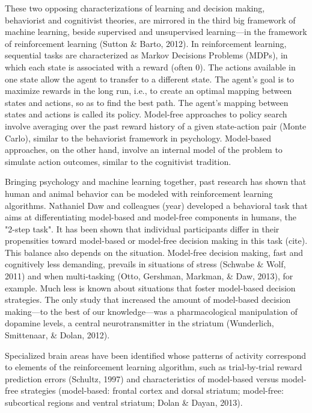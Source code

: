 \documentclass[11pt]{article} %
\begin{document}
These two opposing characterizations of learning and decision making, behaviorist and cognitivist theories, are mirrored in the third big framework of machine learning, beside supervised and unsupervised learning---in the framework of reinforcement learning (Sutton \& Barto, 2012). In reinforcement learning, sequential tasks are characterized as Markov Decisions Problems (MDPs), in which each state is associated with a reward (often 0). The actions available in one state allow the agent to transfer to a different state. The agent's goal is to maximize rewards in the long run, i.e., to create an optimal mapping between states and actions, so as to find the best path. The agent's mapping between states and actions is called its policy. Model-free approaches to policy search involve averaging over the past reward history of a given state-action pair (Monte Carlo), similar to the behaviorist framework in psychology. Model-based approaches, on the other hand, involve an internal model of the problem to simulate action outcomes, similar to the cognitivist tradition.

Bringing psychology and machine learning together, past research has shown that human and animal behavior can be modeled with reinforcement learning algorithms. Nathaniel Daw and colleagues (year) developed a behavioral task that aims at differentiating model-based and model-free components in humans, the "2-step task". It has been shown that individual participants differ in their propensities toward model-based or model-free decision making in this task (cite). This balance also depends on the situation. Model-free decision making, fast and cognitively less demanding, prevails in situations of stress (Schwabe \& Wolf, 2011) and when multi-tasking (Otto, Gershman, Markman, \& Daw, 2013), for example. Much less is known about situations that foster model-based decision strategies. The only study that increased the amount of model-based decision making---to the best of our knowledge---was a pharmacological manipulation of dopamine levels, a central neurotransmitter in the striatum (Wunderlich, Smittenaar, \& Dolan, 2012).

Specialized brain areas have been identified whose patterns of activity correspond to elements of the reinforcement learning algorithm, such as trial-by-trial reward prediction errors (Schultz, 1997) and characteristics of model-based versus model-free strategies (model-based: frontal cortex and dorsal striatum; model-free: subcortical regions and ventral striatum; Dolan \& Dayan, 2013).
\end{document}
